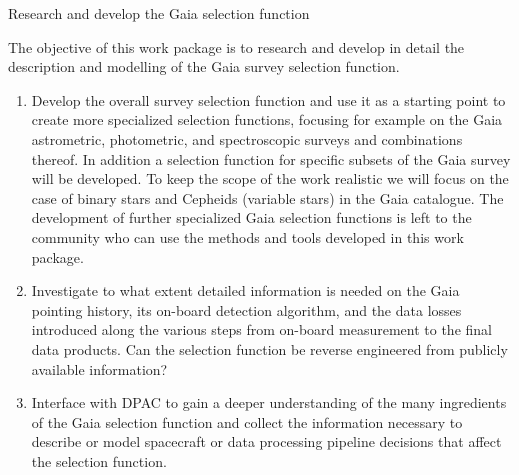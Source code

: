 \begin{workpackage}{Research and develop the Gaia selection function}
  \label{wp:selfungaia}
  \wpend{\duration} %
  
  \makewptable %

  \begin{wpobjectives}
    The objective of this work package is to research and develop in detail the description and modelling of the Gaia survey selection function.
    \begin{enumerate}
      \item Develop the overall survey selection function and use it as a starting point to create more specialized selection functions, focusing for example on the Gaia astrometric, photometric, and spectroscopic surveys and combinations thereof. In addition a selection function for specific subsets of the Gaia survey will be developed. To keep the scope of the work realistic we will focus on the case of binary stars and Cepheids (variable stars) in the Gaia catalogue. The development of further specialized Gaia selection functions is left to the community who can use the methods and tools developed in this work package. 
      \item Investigate to what extent detailed information is needed on the Gaia pointing history, its on-board detection algorithm, and the data losses introduced along the various steps from on-board measurement to the final data products. Can the selection function be reverse engineered from publicly available information?
      \item Interface with DPAC to gain a deeper understanding of the many ingredients of the Gaia selection function and collect the information necessary to describe or model spacecraft or data processing pipeline decisions that affect the selection function.
    \end{enumerate}
  \end{wpobjectives}

  \begin{wpdescription}


\end{wpdescription}
\end{workpackage}
